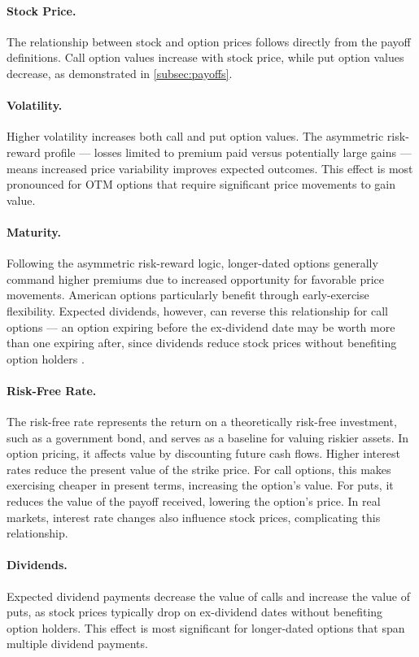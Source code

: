 \documentclass[english,12pt,a4paper,pdftex,sci,utf8]{aaltothesis}
\begin{document}
\paragraph{Stock Price.} The relationship between stock and option prices follows directly from the payoff definitions. Call option values increase with stock price, while put option values decrease, as demonstrated in \cref{subsec:payoffs}.

\paragraph{Volatility.} Higher volatility increases both call and put option values. The asymmetric risk-reward profile --- losses limited to premium paid versus potentially large gains --- means increased price variability improves expected outcomes. This effect is most pronounced for OTM options that require significant price movements to gain value.

\paragraph{Maturity.} Following the asymmetric risk-reward logic, longer-dated options generally command higher premiums due to increased opportunity for favorable price movements. American options particularly benefit through early-exercise flexibility. Expected dividends, however,  can reverse this relationship for call options --- an option expiring before the ex-dividend date may be worth more than one expiring after, since dividends reduce stock prices without benefiting option holders \cite{hull2018}.

\paragraph{Risk-Free Rate.} The risk-free rate represents the return on a theoretically risk-free investment, such as a government bond, and serves as a baseline for valuing riskier assets. In option pricing, it affects value by discounting future cash flows. Higher interest rates reduce the present value of the strike price. For call options, this makes exercising cheaper in present terms, increasing the option’s value. For puts, it reduces the value of the payoff received, lowering the option’s price. In real markets, interest rate changes also influence stock prices, complicating this relationship.

\paragraph{Dividends.} Expected dividend payments decrease the value of calls and increase the value of puts, as stock prices typically drop on ex-dividend dates without benefiting option holders. This effect is most significant for longer-dated options that span multiple dividend payments.
\end{document}
